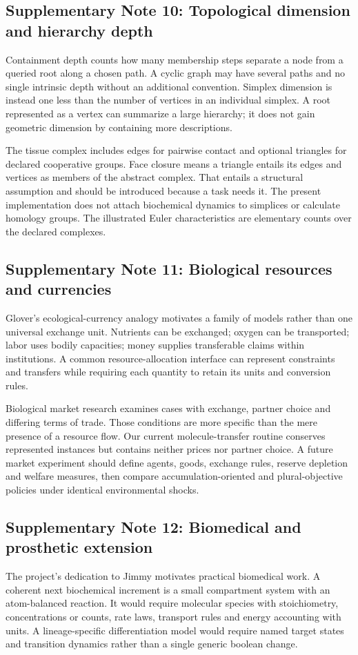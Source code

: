\documentclass[10pt,a4paper]{article}
\begin{document}
\subsection*{Supplementary Note 10: Topological dimension and hierarchy depth}
Containment depth counts how many membership steps separate a node from a queried root along a chosen path. A cyclic graph may have several paths and no single intrinsic depth without an additional convention. Simplex dimension is instead one less than the number of vertices in an individual simplex. A root represented as a vertex can summarize a large hierarchy; it does not gain geometric dimension by containing more descriptions.

The tissue complex includes edges for pairwise contact and optional triangles for declared cooperative groups. Face closure means a triangle entails its edges and vertices as members of the abstract complex. That entails a structural assumption and should be introduced because a task needs it. The present implementation does not attach biochemical dynamics to simplices or calculate homology groups. The illustrated Euler characteristics are elementary counts over the declared complexes.

\subsection*{Supplementary Note 11: Biological resources and currencies}
Glover's ecological-currency analogy motivates a family of models rather than one universal exchange unit. Nutrients can be exchanged; oxygen can be transported; labor uses bodily capacities; money supplies transferable claims within institutions. A common resource-allocation interface can represent constraints and transfers while requiring each quantity to retain its units and conversion rules.

Biological market research examines cases with exchange, partner choice and differing terms of trade\cite{werner}. Those conditions are more specific than the mere presence of a resource flow. Our current molecule-transfer routine conserves represented instances but contains neither prices nor partner choice. A future market experiment should define agents, goods, exchange rules, reserve depletion and welfare measures, then compare accumulation-oriented and plural-objective policies under identical environmental shocks.

\subsection*{Supplementary Note 12: Biomedical and prosthetic extension}
The project's dedication to Jimmy motivates practical biomedical work. A coherent next biochemical increment is a small compartment system with an atom-balanced reaction. It would require molecular species with stoichiometry, concentrations or counts, rate laws, transport rules and energy accounting with units. A lineage-specific differentiation model would require named target states and transition dynamics rather than a single generic boolean change.
\end{document}
